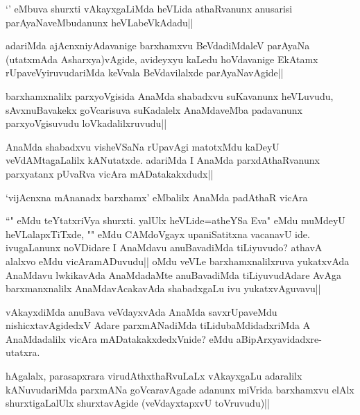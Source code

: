 \begin{artha}%
`\stext ' eMbuva shurxti vAkayxgaLiMda heVLida athaRvanunx anusarisi parAyaNaveMbudanunx heVLabeVkAdadu||
\end{artha}

\begin{artha}
adariMda ajAcnxniyAdavanige barxhamxvu BeVdadiMdaleV parAyaNa (utatxmAda Asharxya)vAgide, avideyxyu kaLedu hoVdavanige EkAtamx rUpaveVyiruvudariMda keVvala BeVdavilalxde parAyaNavAgide||
\end{artha}

\begin{artha}
barxhamxnalilx parxyoVgisida AnaMda shabadxvu suKavanunx heVLuvudu, sAvxnuBavakekx goVcarisuva suKadalelx AnaMdaveMba padavanunx parxyoVgisuvudu loVkadalilxruvudu||
\end{artha}

\begin{artha}
AnaMda shabadxvu visheVSaNa rUpavAgi matotxMdu kaDeyU veVdAMtagaLalilx kANutatxde. adariMda I AnaMda parxdAthaRvanunx parxyatanx pUvaRva vicAra mADatakakxdudx||
\end{artha}

\begin{center}%
`vijAcnxna mAnanadx barxhamx' eMbalilx AnaMda padAthaR vicAra
\end{center}

\begin{artha}
``\stext " eMdu teYtatxriVya shurxti. yalUlx heVLide=atheYSa Eva" eMdu muMdeyU heVLalapxTiTxde, "\stext " eMdu CAMdoVgayx upaniSatitxna vacanavU ide. ivugaLanunx noVDidare I AnaMdavu anuBavadiMda tiLiyuvudo? athavA alalxvo eMdu vicAramADuvudu|| oMdu veVLe barxhamxnalilxruva yukatxvAda AnaMdavu lwkikavAda AnaMdadaMte anuBavadiMda tiLiyuvudAdare AvAga barxmanxnalilx AnaMdavAcakavAda shabadxgaLu ivu yukatxvAguvavu||
\end{artha}


\begin{artha}
vAkayxdiMda anuBava veVdayxvAda AnaMda savxrUpaveMdu nishicxtavAgidedxV Adare parxmANadiMda tiLidubaMdidadxriMda A AnaMdadalilx vicAra mADatakakxdedxVnide? eMdu aBipArxyavidadxre- utatxra.
\end{artha}%

\begin{artha}
hAgalalx, parasapxrara virudAthxthaRvuLaLx vAkayxgaLu adaralilx kANuvudariMda parxmANa goVcaravAgade adanunx miVrida barxhamxvu elAlx shurxtigaLalUlx shurxtavAgide (veVdayxtapxvU toVruvudu)||
\end{artha}

